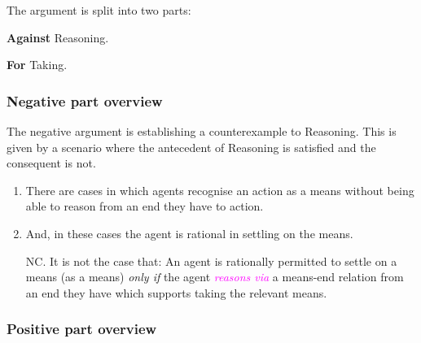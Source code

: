 \documentclass[10pt]{article}
\newcommand{\schemaName}[1]{\textsf{#1}}
\begin{document}
The argument is split into two parts:
\begin{enumerate*}[label=\roman*., ref=(\roman*)]
\item\label{position:Against} \textbf{Against} \schemaName{Reasoning}.
\item\label{position:For} \textbf{For} \schemaName{Taking}.
\end{enumerate*}

\subsubsection{Negative part overview}
\label{sec:negat-part-overv}

The negative argument is establishing a counterexample to \schemaName{Reasoning}.
This is given by a scenario where the antecedent of \schemaName{Reasoning} is satisfied and the consequent is not.

\begin{enumerate}[label=N\arabic*., ref=(N\arabic*)]

\item\label{scenarios:exist} There are cases in which agents recognise an action as a means without being able to reason from an end they have to action.

\item\label{scenarios:persmissible} And, in these cases the agent is rational in settling on the means.

\item[NC.]\label{scenario:no-reasoning} It is not the case that:
  An agent is rationally permitted to settle on a means (as a means)  \emph{only if} the agent \textcolor{fuchsia}{\emph{reasons via}} a means-end relation from an end they have which supports taking the relevant means.
\end{enumerate}

\subsubsection{Positive part overview}
\label{sec:posit-part-overv}




\end{document}
